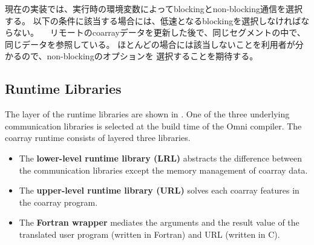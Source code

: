 現在の実装では、実行時の環境変数によってblockingとnon-blocking通信を選択する。
以下の条件に該当する場合には、低速となるblockingを選択しなければならない。
　リモートのcoarrayデータを更新した後で、同じセグメントの中で、同じデータを参照している。
ほとんどの場合には該当しないことを利用者が分かるので、non-blockingのオプションを
選択することを期待する。


\subsection{Runtime Libraries}\label{sec:runtime}

The layer of the runtime libraries are shown in .
One of the three underlying communication libraries is selected 
at the build time of the Omni compiler.
The coarray runtime consists of layered three libraries.
\begin{itemize}
\item
The {\bf lower-level runtime library (LRL)} abstracts the difference between 
the communication libraries except the memory management of coarray data.
\item
The {\bf upper-level runtime library (URL)} solves each coarray features 
in the coarray program.
\item
The {\bf Fortran wrapper} mediates the arguments and the result value 
of the translated user program (written in Fortran) and URL (written in C).
\end{itemize}



